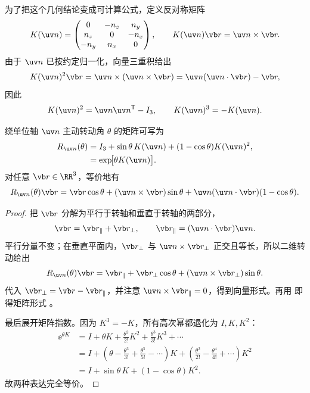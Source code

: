 为了把这个几何结论变成可计算公式，定义反对称矩阵
\[
K(\uv n)=
\begin{pmatrix}
0&-n_z&n_y\\
n_z&0&-n_x\\
-n_y&n_x&0
\end{pmatrix},
\qquad
K(\uv n)\vb r=\uv n\times\vb r.
\]
由于 $\uv n$ 已按约定归一化，向量三重积给出
\[
K(\uv n)^2\vb r
=\uv n\times(\uv n\times\vb r)
=\uv n(\uv n\cdot\vb r)-\vb r,
\]
因此
\begin{equation}
K(\uv n)^2=\uv n\uv n^{\mathsf T}-I_3,
\qquad
K(\uv n)^3=-K(\uv n).
\label{eq:K-identities}
\end{equation}

\begin{theorem}
绕单位轴 $\uv n$ 主动转动角 $\theta$ 的矩阵可写为
\begin{align}
R_{\uv n}(\theta)
&=I_3+\sin\theta\,K(\uv n)
 +(1-\cos\theta)K(\uv n)^2,\label{eq:rodrigues-so3}\\
&=\exp\!\bigl[\theta K(\uv n)\bigr].\label{eq:so3-exponential}
\end{align}
对任意 $\vb r\in\RR^3$，等价地有
\[
R_{\uv n}(\theta)\vb r
=\vb r\cos\theta
 +(\uv n\times\vb r)\sin\theta
 +\uv n(\uv n\cdot\vb r)(1-\cos\theta).
\]

\end{theorem}

\begin{proof}
把 $\vb r$ 分解为平行于转轴和垂直于转轴的两部分，
\[
\vb r=\vb r_{\parallel}+\vb r_\perp,
\qquad
\vb r_{\parallel}=(\uv n\cdot\vb r)\uv n.
\]
平行分量不变；在垂直平面内，$\vb r_\perp$ 与 $\uv n\times\vb r_\perp$ 正交且等长，所以二维转动给出
\[
R_{\uv n}(\theta)\vb r
=\vb r_{\parallel}
 +\vb r_\perp\cos\theta
 +(\uv n\times\vb r_\perp)\sin\theta.
\]
代入 $\vb r_\perp=\vb r-\vb r_{\parallel}$，并注意 $\uv n\times\vb r_{\parallel}=0$，得到向量形式。再用  即得矩阵形式 。

最后展开矩阵指数。因为 $K^3=-K$，所有高次幂都退化为 $I,K,K^2$：
\begin{align*}
\ee^{\theta K}
&=I+\theta K+\frac{\theta^2}{2!}K^2
 +\frac{\theta^3}{3!}K^3+\cdots\\
&=I+
\left(\theta-\frac{\theta^3}{3!}+\frac{\theta^5}{5!}-\cdots\right)K
+
\left(\frac{\theta^2}{2!}-\frac{\theta^4}{4!}+\cdots\right)K^2\\
&=I+\sin\theta\,K+(1-\cos\theta)K^2.
\end{align*}
故两种表达完全等价。
\end{proof}

